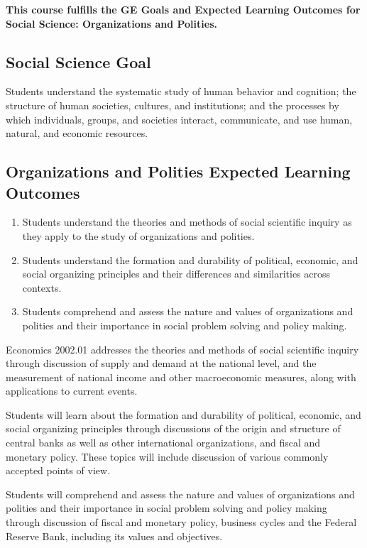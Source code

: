 \documentclass[12pt]{article}
\begin{document}
\textbf{This course fulfills the GE Goals and Expected Learning Outcomes for Social Science: Organizations and Polities.}

\subsection*{Social Science Goal}

Students understand the systematic study of human behavior and cognition; the structure of human societies, cultures, and institutions; and the processes by which individuals, groups, and societies interact, communicate, and use human, natural, and economic resources.

\subsection*{Organizations and Polities Expected Learning Outcomes}
\begin{enumerate}
    \item Students understand the theories and methods of social scientific inquiry as they apply to the study of organizations and polities.
    \item Students understand the formation and durability of political, economic, and social organizing principles and their differences and similarities across contexts.
    \item Students comprehend and assess the nature and values of organizations and polities and their importance in social problem solving and policy making.
\end{enumerate}

Economics 2002.01 addresses the theories and methods of social scientific inquiry through discussion of supply and demand at the national level, and the measurement of national income and other macroeconomic measures, along with applications to current events.

Students will learn about the formation and durability of political, economic, and social organizing principles through discussions of the origin and structure of central banks as well as other international organizations, and fiscal and monetary policy. These topics will include discussion of various commonly accepted points of view.

Students will comprehend and assess the nature and values of organizations and polities and their importance in social problem solving and policy making through discussion of fiscal and monetary policy, business cycles and the Federal Reserve Bank, including its values and objectives.
\end{document}
